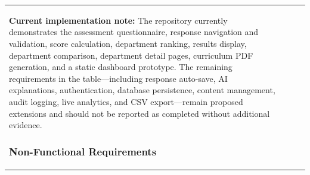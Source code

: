 \documentclass[12pt, a4paper]{article}
\begin{document}
\begin{itemize}[leftmargin=1.5em, itemsep=3pt]
\begin{table}[H]
\begin{tabularx}{\textwidth}{>{\raggedright\arraybackslash}p{0.8cm}>{\raggedright\arraybackslash}p{3.5cm}>{\raggedright\arraybackslash}X>{\raggedright\arraybackslash}p{2.5cm}}
\textbf{Current implementation note:} The repository currently demonstrates the assessment questionnaire, response navigation and validation, score calculation, department ranking, results display, department comparison, department detail pages, curriculum PDF generation, and a static dashboard prototype. The remaining requirements in the table---including response auto-save, AI explanations, authentication, database persistence, content management, audit logging, live analytics, and CSV export---remain proposed extensions and should not be reported as completed without additional evidence.

\subsubsection*{Non-Functional Requirements}




\end{tabularx}
\end{table}
\end{itemize}
\end{document}

